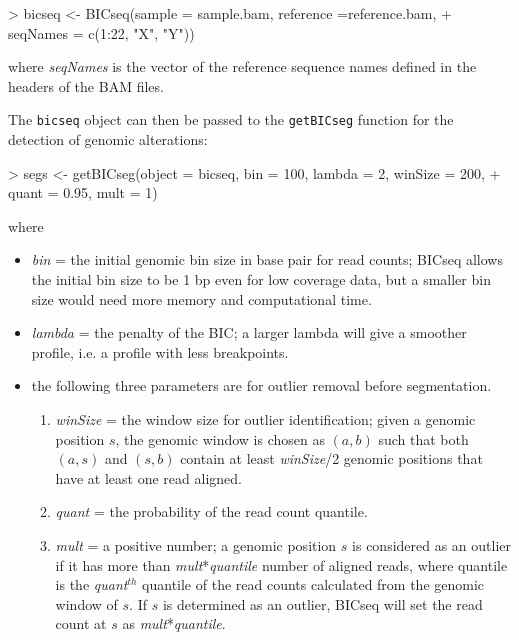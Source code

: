 \documentclass[12pt]{article}
\newcommand{\Robject}[1]{{\texttt{#1}}}
\newcommand{\Rfunction}[1]{{\texttt{#1}}}
\begin{document}
\begin{Schunk}
\begin{Sinput}
> bicseq <- BICseq(sample = sample.bam, reference =reference.bam,  
+     seqNames = c(1:22, "X", "Y"))
\end{Sinput}
\end{Schunk}
where \textit{seqNames} is the vector of the reference sequence names defined in the headers 
of the BAM files.

The \Robject{bicseq} object can then be passed to the \Rfunction{getBICseg} 
function for the detection of genomic alterations:

\begin{Schunk}
\begin{Sinput}
> segs <- getBICseg(object = bicseq, bin = 100, lambda = 2, winSize = 200,  
+     quant = 0.95, mult = 1)
\end{Sinput}
\end{Schunk}
where
\begin{itemize}
\item \textit{bin} = the initial genomic bin size in base pair for read counts; 
    BICseq allows the initial bin size to be 1 bp even for low coverage data, but 
   a smaller bin size would need more memory and computational time. 
\item \textit{lambda} = the penalty of the BIC; 
   a larger lambda will give a smoother profile, i.e. a profile with less breakpoints.
\item the following three parameters are for outlier removal before segmentation. 
\begin{enumerate}
\item \textit{winSize} = the window size for outlier identification; given a genomic 
    position $s$, the genomic window is chosen as $(a,b)$ such that both $(a,s)$ 
    and $(s,b)$ contain at least \textit{winSize}/2 genomic positions that have at 
    least one read aligned.
\item \textit{quant} = the probability of the read count quantile.
\item \textit{mult} = a positive number; a genomic position $s$ is considered as an 
    outlier if it has more than \textit{mult}*\textit{quantile} number of aligned 
    reads, where quantile is the \textit{quant}$^{th}$ quantile of the read counts 
    calculated from the genomic window of $s$. If $s$ is determined as an outlier, 
    BICseq will set the read count at $s$ as \textit{mult}*\textit{quantile}.
\end{enumerate}
\end{itemize}
\end{document}
